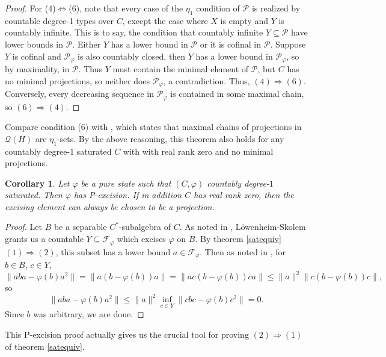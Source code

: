 \documentclass[10pt]{amsart}
\newtheorem{cor}[thm]{Corollary}
\theoremstyle{definition}
\newcommand{\Fp}{\mathscr{F}_\varphi}
\newcommand{\Pp}{\mathscr{P}_\varphi}
\begin{document}
\begin{proof}
    For (4)$\Leftrightarrow$(6), note that every case of the $\eta_1$ condition of $\mathscr{P}$ is realized by countable degree-1 types over $C$, except the case where $X$ is empty and $Y$ is countably infinite. This is to say, the condition that countably infinite $Y\subseteq\mathscr{P}$ have lower bounds in $\mathscr{P}$. Either $Y$ has a lower bound in $\mathscr{P}$ or it is cofinal in $\mathscr{P}$. Suppose $Y$ is cofinal and $\Pp$ is also countably closed, then $Y$ has a lower bound in $\Pp$, so by maximality, in $\mathscr{P}$. Thus $Y$ must contain the minimal element of $\mathscr{P}$, but $C$ has no minimal projections, so neither does $\Pp$, a contradiction. Thus, $(4)\Rightarrow(6)$. Conversely, every decreasing sequence in $\Pp$ is contained in some maximal chain, so $(6)\Rightarrow (4)$.
\end{proof}

Compare condition (6) with \cite[3]{HA98}, which states that maximal chains of projections in $\mathscr{Q}(H)$ are $\eta_1$-sets. By the above reasoning, this theorem also holds for any countably degree-1 saturated $C$ with with real rank zero and no minimal projections.

\begin{cor}\label{sqe}
Let $\varphi$ be a pure state such that $(C,\varphi)$ countably degree-$1$ saturated. Then $\varphi$ has P-excision. If in addition $C$ has real rank zero, then the excising element can always be chosen to be a projection.
\end{cor}

\begin{proof}
    Let $B$ be a separable $C^*$-subalgebra of $C$. As noted in \cite[15.3.7]{FA19}, Löwenheim-Skolem grants us a countable $Y\subseteq\Fp$ which excises $\varphi$ on $B$. By theorem \ref{satequiv} $(1)\Rightarrow (2)$, this subset has a lower bound $a\in\Fp$. Then as noted in \cite[15.3.8]{FA19}, for $b\in B$, $c\in Y$,
    \[\|aba-\varphi(b)a^2\|=\|a(b-\varphi(b))a\|=\|ac(b-\varphi(b))ca\|\leq \|a\|^2\|c(b-\varphi(b))c\|,\]
    so
    \[\|aba-\varphi(b)a^2\|\leq \|a\|^2\inf_{c\in Y}\|cbc-\varphi(b)c^2\|=0.\]
    Since $b$ was arbitrary, we are done.
\end{proof}

This P-excision proof actually gives us the crucial tool for proving $(2)\Rightarrow (1)$ of theorem \ref{satequiv}.
\end{document}
